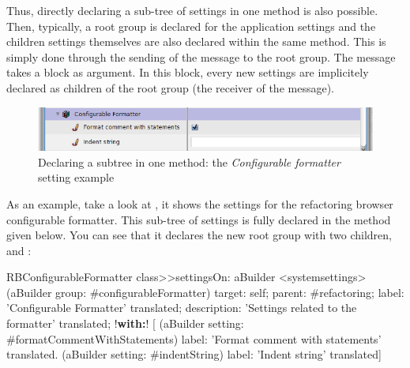 \documentclass[a4paper,10pt,twoside]{book}
\begin{document}
Thus, directly declaring a sub-tree of settings in one method is also possible. Then, typically, a root group is declared for the application settings and the children settings themselves are also declared within the same method. This is simply done through the sending of the  message to the root group. The  message takes a block as argument. In this block, every new settings are implicitely declared as children of the root group (the receiver of the  message). 

\begin{figure}[tbh]
\begin{center}
\includegraphics[scale=0.47]{configurableFormatter}
\caption{Declaring a subtree in one method: the \textit{Configurable formatter} setting example}
\end{center}
\end{figure}
As an example, take a look at , it shows the settings for the refactoring browser configurable formatter. This sub-tree of settings is fully declared in the method  given below. You can see that it declares the new root group  with two children,  and :
\begin{code}{}
RBConfigurableFormatter class>>settingsOn: aBuilder
	<systemsettings>	
	(aBuilder group: #configurableFormatter)
		target: self;
		parent: #refactoring;
		label: 'Configurable Formatter' translated;
		description: 'Settings related to the formatter' translated;
		!\textbf{with:}! [
			(aBuilder setting: #formatCommentWithStatements)
				label: 'Format comment with statements' translated.
			(aBuilder setting: #indentString)
				label: 'Indent string' translated]
\end{code}
\end{document}
